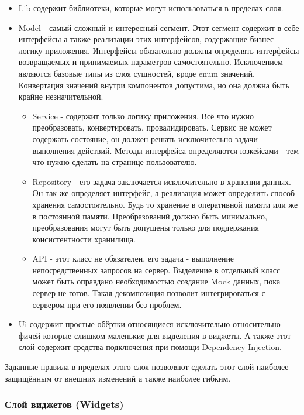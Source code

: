 \documentclass[14pt]{extarticle}
\begin{document}
\begin{itemize}
	\item Lib содержит библиотеки, которые могут использоваться в пределах слоя.
	\item Model - самый сложный и интересный сегмент. Этот сегмент содержит в себе интерфейсы а также реализации этих интерфейсов, содержащие
	бизнес логику приложения. Интерфейсы обязательно должны определять интерфейсы возвращаемых и принимаемых параметров самостоятельно. Исключением
	являются базовые типы из слоя сущностей, вроде enum значений. Конвертация значений внутри компонентов допустима, но она должна быть крайне незначительной.
	\begin{itemize}
		\item Service - содержит только логику приложения. Всё что нужно преобразовать, конвертировать, провалидировать. Сервис не может содержать состояние, 
		он должен решать исключительно задачи выполнения действий. Методы интерфейса определяются юзкейсами - тем что нужно сделать на странице пользователю.
		\item Repository - его задача заключается исключительно в хранении данных. Он так же определяет интерфейс, а реализация может
		определить способ хранения самостоятельно. Будь то хранение в оперативной памяти или же в постоянной памяти. Преобразований должно быть минимально, 
		преобразования могут быть допущены только для поддержания консистентности хранилища.
		\item API - этот класс не обязателен, его задача - выполнение непосредственных запросов на сервер. Выделение в отдельный класс может быть оправдано
		необходимостью создание Mock данных, пока сервер не готов. Такая декомпозиция позволит интегрироваться с сервером при его появлении без проблем.
	\end{itemize}
	\item Ui содержит простые обёртки относящиеся исключительно относительно фичей которые слишком маленькие для выделения в виджеты. А также этот слой содержит
	средства подключения при помощи Dependency Injection.
\end{itemize}

Заданные правила в пределах этого слоя позволяют сделать этот слой наиболее защищённым от внешних изменений а также наиболее гибким.

\subsubsection{Слой виджетов (Widgets)}
\end{document}
